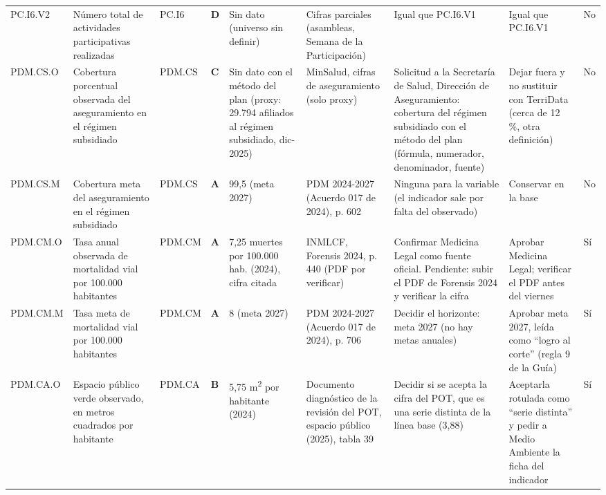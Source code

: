 \documentclass[11pt,letterpaper]{article}
\begin{document}
{\begin{xltabular}{\linewidth}{L{1.94cm}L{2.56cm}L{2.04cm}L{1.12cm}L{2.87cm}L{2.87cm}L{2.71cm}L{2.77cm}L{2.04cm}}
PC.I6.V2 & Número total de actividades participativas realizadas & PC.I6 & \textbf{D} & Sin dato (universo sin definir) & Cifras parciales (asambleas, Semana de la Participación) & Igual que PC.I6.V1 & Igual que PC.I6.V1 & No \\
PDM.CS.O & Cobertura porcentual observada del aseguramiento en el régimen subsidiado & PDM.CS & \textbf{C} & Sin dato con el método del plan (proxy: 29.794 afiliados al régimen subsidiado, dic-2025) & MinSalud, cifras de aseguramiento (solo proxy) & Solicitud a la Secretaría de Salud, Dirección de Aseguramiento: cobertura del régimen subsidiado con el método del plan (fórmula, numerador, denominador, fuente) & Dejar fuera y no sustituir con TerriData (cerca de 12 \%, otra definición) & No \\
PDM.CS.M & Cobertura meta del aseguramiento en el régimen subsidiado & PDM.CS & \textbf{A} & 99,5 (meta 2027) & PDM 2024-2027 (Acuerdo 017 de 2024), p. 602 & Ninguna para la variable (el indicador sale por falta del observado) & Conservar en la base & No \\
PDM.CM.O & Tasa anual observada de mortalidad vial por 100.000 habitantes & PDM.CM & \textbf{A} & 7,25 muertes por 100.000 hab. (2024), cifra citada & INMLCF, Forensis 2024, p. 440 (PDF por verificar) & Confirmar Medicina Legal como fuente oficial. Pendiente: subir el PDF de Forensis 2024 y verificar la cifra & Aprobar Medicina Legal; verificar el PDF antes del viernes & Sí \\
PDM.CM.M & Tasa meta de mortalidad vial por 100.000 habitantes & PDM.CM & \textbf{A} & 8 (meta 2027) & PDM 2024-2027 (Acuerdo 017 de 2024), p. 706 & Decidir el horizonte: meta 2027 (no hay metas anuales) & Aprobar meta 2027, leída como ``logro al corte'' (regla 9 de la Guía) & Sí \\
PDM.CA.O & Espacio público verde observado, en metros cuadrados por habitante & PDM.CA & \textbf{B} & 5,75 m\textsuperscript{2} por habitante (2024) & Documento diagnóstico de la revisión del POT, espacio público (2025), tabla 39 & Decidir si se acepta la cifra del POT, que es una serie distinta de la línea base (3,88) & Aceptarla rotulada como ``serie distinta'' y pedir a Medio Ambiente la ficha del indicador & Sí \\

\end{xltabular}}
\end{document}
